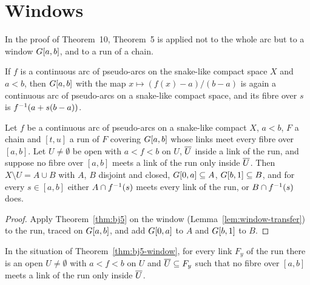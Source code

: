 
\section{Windows}

In the proof of Theorem~10, Theorem~5 is applied not to the whole arc but to a window $G[a,b]$, and to a run of a chain.

\begin{lemma}\label{lem:window-transfer}
If $f$ is a continuous arc of pseudo-arcs on the snake-like compact space $X$ and $a<b$, then $G[a,b]$ with the map $x\mapsto(f(x)-a)/(b-a)$ is again a
continuous arc of pseudo-arcs on a snake-like compact space, and its fibre over $s$ is $f^{-1}(a+s(b-a))$.
\end{lemma}


\begin{theorem}\label{thm:bj5-window}
Let $f$ be a continuous arc of pseudo-arcs on a snake-like compact $X$, $a<b$, $F$ a chain and $[t,u]$ a run of $F$ covering $G[a,b]$ whose links meet every fibre
over $[a,b]$. Let $U\neq\emptyset$ be open with $a<f<b$ on $U$, $\overline{U}$ inside a link of the run, and suppose no fibre over $[a,b]$ meets a link of the run only
inside $\overline{U}$. Then $X\setminus U=A\cup B$ with $A$, $B$ disjoint and closed, $G[0,a]\subseteq A$, $G[b,1]\subseteq B$, and for every $s\in[a,b]$ either
$A\cap f^{-1}(s)$ meets every link of the run, or $B\cap f^{-1}(s)$ does.
\end{theorem}

\begin{proof}
Apply Theorem~\ref{thm:bj5} on the window (Lemma~\ref{lem:window-transfer}) to the run, traced on $G[a,b]$, and add $G[0,a]$ to $A$ and $G[b,1]$ to $B$.
\end{proof}


\begin{lemma}\label{lem:window-set}
In the situation of Theorem~\ref{thm:bj5-window}, for every link $F_y$ of the run there is an open $U\ne\emptyset$ with $a<f<b$ on $U$ and $\overline{U}\subseteq F_y$
such that no fibre over $[a,b]$ meets a link of the run only inside $\overline{U}$.
\end{lemma}

